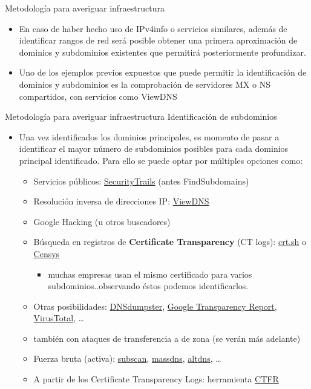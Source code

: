\documentclass[aspectratio=169,11pt]{beamer}
\begin{document}
\begin{frame}[allowframebreaks]{Metodología para averiguar infraestructura}
\small
  \begin{itemize}
  \item En caso de haber hecho uso de IPv4info o servicios similares, además de identificar rangos de red será posible obtener una primera aproximación de dominios y subdominios existentes que permitirá posteriormente profundizar.
  \item Uno de los ejemplos previos expuestos que puede permitir la identificación de dominios y subdominios es la comprobación de servidores MX o NS compartidos, con servicios como ViewDNS

  \end{itemize}
\end{frame}


\begin{frame}[allowframebreaks]{Metodología para averiguar infraestructura}
\small
Identificación de subdominios
  \begin{itemize}
  \item Una vez identificados los dominios principales, es momento de pasar a identificar el mayor número de subdominios posibles para cada dominios principal identificado. Para ello se puede optar por múltiples opciones como:
    \begin{itemize}
  \item Servicios públicos: \href{https://securitytrails.com/}{SecurityTrails} (antes FindSubdomains)
  \item Resolución inversa de direcciones IP: \href{https://viewdns.info/}{ViewDNS}
  \item Google Hacking (u otros buscadores)
  \item Búsqueda en registros de \textbf{Certificate Transparency} (CT logs): \href{https://crt.sh}{crt.sh} o \href{https://search.censys.io/}{Censys}
   \begin{itemize}
  \item muchas empresas usan el mismo certificado para varios subdominios..observando éstos podemos identificarlos.
   \end{itemize}
  \item Otras posibilidades: \href{https://dnsdumpster.com/}{DNSdumpster}, \href{https://transparencyreport.google.com/https/certificates}{Google Transparency Report}, \href{https://www.virustotal.com/}{VirusTotal}, \dots{}
  \item también con ataques de transferencia a de zona (se verán más adelante)
  \item Fuerza bruta (activa): \href{https://github.com/eredotpkfr/subscan}{subscan}, \href{https://github.com/blechschmidt/massdns}{massdns}, \href{https://github.com/infosec-au/altdns}{altdns}, \dots{}
  \item A partir de los Certificate Transparency Logs: herramienta \href{https://github.com/UnaPibaGeek/ctfr}{CTFR}

  \end{itemize}

\end{itemize}
\end{frame}
\end{document}
